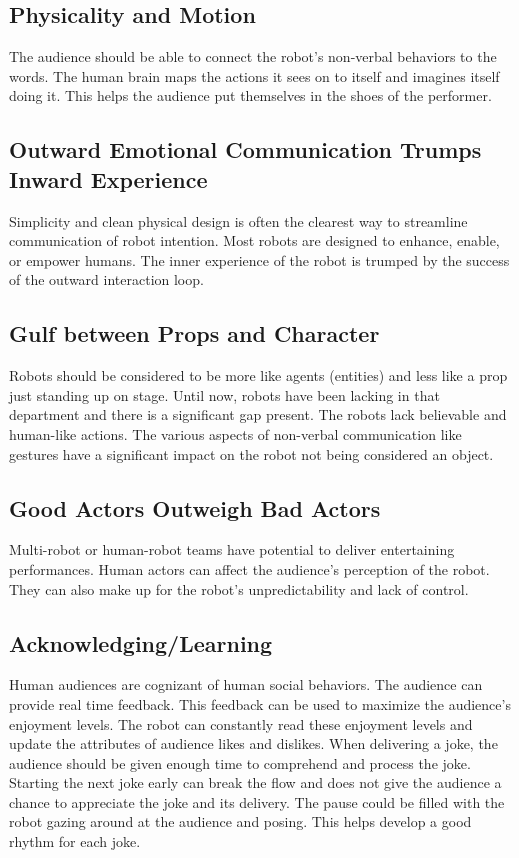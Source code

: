 \documentclass[onecolumn, draftclsnofoot,10pt, compsoc]{IEEEtran}
\begin{document}
\subsection{Physicality and Motion}
The audience should be able to connect the robot's non-verbal behaviors to the words. The human brain maps the actions it sees on to itself and imagines itself doing it. This helps the audience put themselves in the shoes of the performer. 

\subsection{Outward Emotional Communication Trumps Inward Experience}
Simplicity and clean physical design is often the clearest way to streamline communication of robot intention. Most robots are designed to enhance, enable, or empower humans. The inner experience of the robot is trumped by the success of the outward interaction loop.

\subsection{Gulf between Props and Character}
Robots should be considered to be more like agents (entities) and less like a prop just standing up on stage. Until now, robots have been lacking in that department and there is a significant gap present. The robots lack believable and human-like actions. The various aspects of non-verbal communication like gestures have a significant impact on the robot not being considered an object.

\subsection{Good Actors Outweigh Bad Actors}
Multi-robot or human-robot teams have potential to deliver entertaining performances. Human actors can affect the audience's perception of the robot. They can also make up for the robot's unpredictability and lack of control.

\subsection{Acknowledging/Learning}
Human audiences are cognizant of human social behaviors. The audience can provide real time feedback. This feedback can be used to maximize the audience's enjoyment levels. The robot can constantly read these enjoyment levels and update the attributes of audience likes and dislikes. When delivering a joke, the audience should be given enough time to comprehend and process the joke. Starting the next joke early can break the flow and does not give the audience a chance to appreciate the joke and its delivery. The pause could be filled with the robot gazing around at the audience and posing. This helps develop a good rhythm for each joke.
\end{document}

